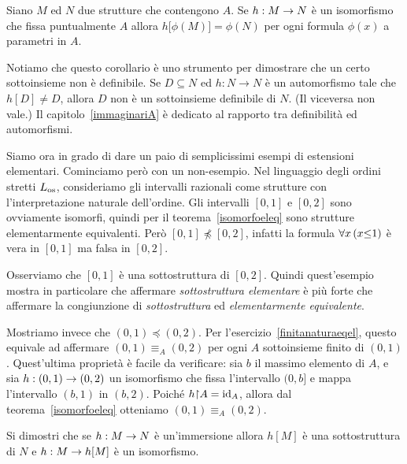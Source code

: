 \begin{corollary}
Siano $M$ ed $N$ due strutture che contengono $A$. Se $h:M\rightarrow N$ \`e un isomorfismo che fissa puntualmente $A$ allora $h\big[\phi(M)\big]=\phi(N)$ per ogni formula $\phi(x)$ a parametri in $A$.\QED
\end{corollary}

Notiamo che questo corollario \`e uno strumento per dimostrare che un certo sottoinsieme non \`e definibile. Se $D\subseteq N$ ed $h:N\to N$ \`e un automorfismo tale che $h[D]\neq D$, allora $D$ non \`e un sottoinsieme definibile di $N$. (Il viceversa non vale.) Il capitolo~\ref{immaginariA} \`e dedicato al rapporto tra definibilit\`a ed automorfismi.

\begin{example}\label{expl_ordini_elem}
Siamo ora in grado di dare un paio di semplicissimi esempi di estensioni elementari. Cominciamo per\`o con un non-esempio. Nel linguaggio degli ordini stretti $L_{\rm os}$,  consideriamo gli intervalli razionali come strutture con l'interpretazione naturale dell'ordine. Gli intervalli $[0,1]$ e $[0,2]$ sono ovviamente isomorfi, quindi per il teorema~\ref{isomorfoeleq} sono strutture elementarmente equivalenti.  Per\`o $[0,1]\npreceq [0,2]$, infatti la formula $\forall  x\,(x\mathord\le1)$ \`e vera in $[0,1]$ ma falsa in $[0,2]$.

Osserviamo che $[0,1]$ \`e una sottostruttura di $[0,2]$. Quindi quest'esempio mostra in particolare che affermare \textit{sottostruttura elementare\/} \`e pi\`u forte che affermare la congiunzione di \textit{sottostruttura\/} ed \textit{elementarmente equivalente}. 

Mostriamo invece che $(0,1)\preceq (0,2)$. Per l'esercizio~\ref{finitanaturaeqel}, questo equivale ad affermare $(0,1)\equiv_A  (0,2)$ per ogni $A$ sottoinsieme finito di $(0,1)$. Quest'ultima propriet\`a \`e facile da verificare: sia $b$ il massimo elemento di $A$, e sia $h:(0,1)\rightarrow (0,2)$ un isomorfismo  che fissa l'intervallo $(0,b]$ e mappa l'intervallo $(b,1)$ in $(b,2)$. Poich\'e $h\mathord\restriction A=\textrm{id}_A$, allora dal teorema~\ref{isomorfoeleq} otteniamo $(0,1)\equiv_A (0,2)$.\QED
\end{example}

\begin{exercise}\label{eximmersioni}
Si dimostri che se $h:M\rightarrow N$ \`e un'immersione allora $h[M]$ \`e una sottostruttura di $N$ e $h:M\rightarrow h[M]$ \`e un isomorfismo.\QED
\end{exercise}

